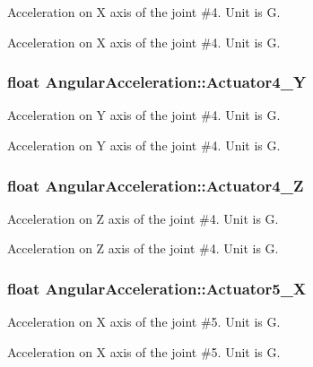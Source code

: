 Acceleration on X axis of the joint \#4. Unit is G. 

Acceleration on X axis of the joint \#4. Unit is G. 
\subsubsection[{\texorpdfstring{Actuator4\+\_\+Y}{Actuator4_Y}}]{\setlength{\rightskip}{0pt plus 5cm}float Angular\+Acceleration\+::\+Actuator4\+\_\+Y}\hypertarget{structAngularAcceleration_ab19b628ee0ba917a65b5f0ccb4c663c0}{}\label{structAngularAcceleration_ab19b628ee0ba917a65b5f0ccb4c663c0}


Acceleration on Y axis of the joint \#4. Unit is G. 

Acceleration on Y axis of the joint \#4. Unit is G. 
\subsubsection[{\texorpdfstring{Actuator4\+\_\+Z}{Actuator4_Z}}]{\setlength{\rightskip}{0pt plus 5cm}float Angular\+Acceleration\+::\+Actuator4\+\_\+Z}\hypertarget{structAngularAcceleration_a4407b12848019a178128df8cd3f7a371}{}\label{structAngularAcceleration_a4407b12848019a178128df8cd3f7a371}


Acceleration on Z axis of the joint \#4. Unit is G. 

Acceleration on Z axis of the joint \#4. Unit is G. 
\subsubsection[{\texorpdfstring{Actuator5\+\_\+X}{Actuator5_X}}]{\setlength{\rightskip}{0pt plus 5cm}float Angular\+Acceleration\+::\+Actuator5\+\_\+X}\hypertarget{structAngularAcceleration_a7ae66f2e31c5e90fe07b234e474ead12}{}\label{structAngularAcceleration_a7ae66f2e31c5e90fe07b234e474ead12}


Acceleration on X axis of the joint \#5. Unit is G. 

Acceleration on X axis of the joint \#5. Unit is G. 
